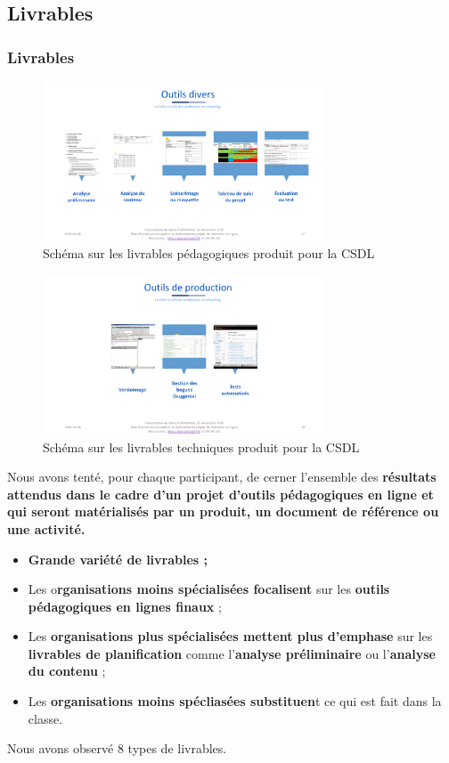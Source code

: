 						 \subsection{Livrables} 
						\begin{frame}[allowframebreaks]
						\frametitle{Livrables}
						\begin{figure}
                     			\centering
                    			 \includegraphics[width = 0.75\textwidth]{livrables1.png}
                     			\caption{\tiny{Schéma sur les livrables pédagogiques produit pour la CSDL}}
                   			\end{figure}
                   			\begin{figure}
                     			\centering
                    			 \includegraphics[width = 0.75\textwidth]{livrables2.png}
                     			\caption{\tiny{Schéma sur les livrables techniques produit pour la CSDL}}
                   			\end{figure}
                   			
                        			Nous avons tenté, pour chaque participant, de cerner l’ensemble des \textbf{résultats attendus dans le cadre d’un projet d’outils pédagogiques en ligne et qui seront matérialisés par un produit, un document de référence ou une activité.}
						\begin{itemize}
							\item \textbf{Grande variété de livrables ;}
							\item Les o\textbf{rganisations moins spécialisées focalisent} sur les \textbf{outils pédagogiques en lignes finaux };
							\item Les \textbf{organisations plus spécialisées mettent plus d'emphase} sur les \textbf{livrables de planification} comme l'\textbf{analyse préliminaire} ou l'\textbf{analyse du contenu} ;
							\item Les \textbf{organisations moins spécliasées substituen}t ce qui est fait dans la classe.
						\end{itemize}		
						Nous avons observé 8 types de livrables.
						

\end{frame}
